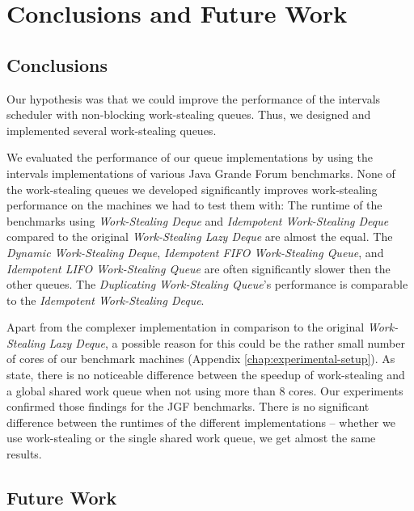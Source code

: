 
\chapter{Conclusions and Future Work}
\label{chap:queues-conclusions-and-future-work}

\section{Conclusions}
\label{sec:queues-conclusions-and-future-work-conclusions}

Our hypothesis was that we could improve the performance of the
intervals scheduler with non-blocking work-stealing queues. Thus, we
designed and implemented several work-stealing queues.

We evaluated the performance of our queue implementations by using the
intervals implementations of various Java Grande Forum
benchmarks. None of the work-stealing queues we developed
significantly improves work-stealing performance on the machines we
had to test them with: The runtime of the benchmarks using
\emph{Work-Stealing Deque} and \emph{Idempotent Work-Stealing Deque}
compared to the original \emph{Work-Stealing Lazy Deque} are almost
the equal. The \emph{Dynamic Work-Stealing Deque}, \emph{Idempotent
  FIFO Work-Stealing Queue}, and \emph{Idempotent LIFO Work-Stealing
  Queue} are often significantly slower then the other queues. The
\emph{Duplicating Work-Stealing Queue}'s performance is comparable to
the \emph{Idempotent Work-Stealing Deque}.

Apart from the complexer implementation in comparison to the original
\emph{Work-Stealing Lazy Deque}, a possible reason for this could be
the rather small number of cores of our benchmark machines (Appendix
\ref{chap:experimental-setup}). As \textcite{Saha2007} state, there is
no noticeable difference between the speedup of work-stealing and a
global shared work queue when not using more than 8 cores. Our
experiments confirmed those findings for the JGF benchmarks. There is
no significant difference between the runtimes of the different
implementations -- whether we use work-stealing or the single shared
work queue, we get almost the same results.


\section{Future Work}
\label{sec:queues-conclusions-and-future-work-future-work}

